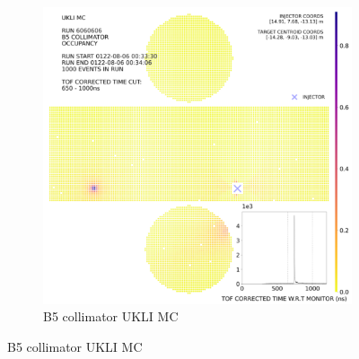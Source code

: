 \begin{figure}[htp]
    
    \begin{subfigure}{0.49\columnwidth}
    \centering
    \includegraphics[width=\textwidth]{Figures/ukli_mc_B5.PNG}
    \caption{B5 collimator UKLI MC}
    
    \end{subfigure}

    \end{figure}

